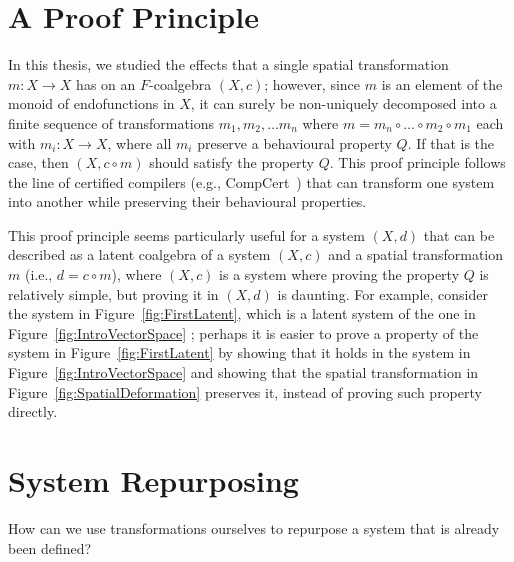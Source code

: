 \section{A Proof Principle}
In this thesis, we studied the effects that a single spatial transformation $m\colon X\rightarrow X$ has on an $F$-coalgebra $(X,c)$; however, since $m$ is an element of the monoid of endofunctions in $X$, it can surely be non-uniquely decomposed into a finite sequence of transformations $m_1, m_2, \ldots m_n$ where $m=m_n\circ\ldots \circ m_2\circ m_1$ each with $m_i\colon X\rightarrow X$, where all $m_i$ preserve a behavioural property $Q$. If that is the case, then $(X,c\circ m)$ should satisfy the property $Q$. This proof principle follows the line of certified compilers (e.g., CompCert~\cite{CompCert}) that can transform one system into another while preserving their behavioural properties.

This proof principle seems particularly useful for a system $(X,d)$ that can be described as a latent coalgebra of a system $(X,c)$ and a spatial transformation $m$ (i.e., $d=c\circ m$), where $(X,c)$ is a system where proving the property $Q$ is relatively simple, but proving it in $(X,d)$ is daunting. 
For example, consider the system in Figure~\ref{fig:FirstLatent}, which is a latent system of the one in Figure~\ref{fig:IntroVectorSpace}%
; perhaps it is easier to prove a property of the system in Figure~\ref{fig:FirstLatent} by showing that it holds in the system in Figure~\ref{fig:IntroVectorSpace} and showing that the spatial transformation in Figure~\ref{fig:SpatialDeformation} preserves it, instead of proving such property directly. 


\section{System Repurposing}
How can we use transformations ourselves to repurpose a system that is already been defined?
